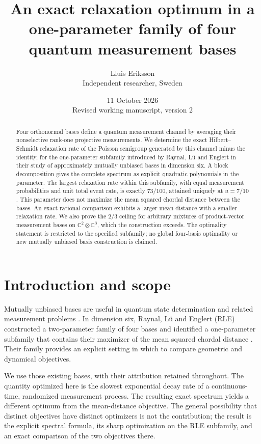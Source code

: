 \documentclass[11pt,a4paper]{article}
\title{An exact relaxation optimum in a one-parameter family of four quantum measurement bases}
\author{Lluis Eriksson\\\small Independent researcher, Sweden}
\date{11 October 2026\\\small Revised working manuscript, version 2}
\theoremstyle{remark}
\newcommand{\C}{\mathbb C}
\begin{document}
\maketitle
\begin{abstract}
Four orthonormal bases define a quantum measurement channel by averaging their nonselective rank-one projective measurements. We determine the exact Hilbert--Schmidt relaxation rate of the Poisson semigroup generated by this channel minus the identity, for the one-parameter subfamily introduced by Raynal, L\"u and Englert in their study of approximately mutually unbiased bases in dimension six. A block decomposition gives the complete spectrum as explicit quadratic polynomials in the parameter. The largest relaxation rate within this subfamily, with equal measurement probabilities and unit total event rate, is exactly $73/100$, attained uniquely at $u=7/10$. This parameter does not maximize the mean squared chordal distance between the bases. An exact rational comparison exhibits a larger mean distance with a smaller relaxation rate. We also prove the $2/3$ ceiling for arbitrary mixtures of product-vector measurement bases on $\C^2\otimes\C^3$, which the construction exceeds. The optimality statement is restricted to the specified subfamily; no global four-basis optimality or new mutually unbiased basis construction is claimed.
\end{abstract}

\section{Introduction and scope}
Mutually unbiased bases are useful in quantum state determination and related measurement problems \cite{wootters,zhu}. In dimension six, Raynal, L\"u and Englert (RLE) constructed a two-parameter family of four bases and identified a one-parameter subfamily that contains their maximizer of the mean squared chordal distance \cite{rle}. Their family provides an explicit setting in which to compare geometric and dynamical objectives.

We use those existing bases, with their attribution retained throughout. The quantity optimized here is the slowest exponential decay rate of a continuous-time, randomized measurement process. The resulting exact spectrum yields a different optimum from the mean-distance objective. The general possibility that distinct objectives have distinct optimizers is not the contribution; the result is the explicit spectral formula, its sharp optimization on the RLE subfamily, and an exact comparison of the two objectives there.
\end{document}
